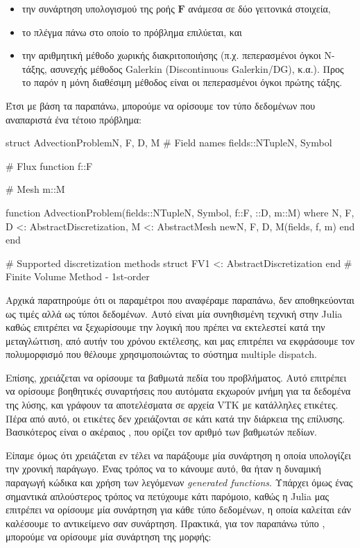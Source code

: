 \begin{itemize}
    \item την συνάρτηση υπολογισμού της ροής $\mathbf{F}$ ανάμεσα σε δύο γειτονικά στοιχεία,
    \item το πλέγμα πάνω στο οποίο το πρόβλημα επιλύεται, και
    \item την αριθμητική μέθοδο χωρικής διακριτοποιήσης (π.χ. πεπερασμένοι όγκοι N-τάξης, ασυνεχής μέθοδος Galerkin (Discontinuous Galerkin/DG), κ.α.). Προς το παρόν η μόνη διαθέσιμη μέθοδος είναι οι πεπερασμένοι όγκοι πρώτης τάξης.
\end{itemize}

Έτσι με βάση τα παραπάνω, μπορούμε να ορίσουμε τον τύπο δεδομένων που αναπαριστά ένα τέτοιο πρόβλημα:

{\large
\begin{jllisting}[language=julia,style=jlcodestyle]
struct AdvectionProblem{N, F, D, M}
    # Field names
    fields::NTuple{N, Symbol}

    # Flux function
    f::F

    # Mesh
    m::M

    function AdvectionProblem(fields::NTuple{N, Symbol}, f::F, ::D, m::M) where
            {N, F, D <: AbstractDiscretization, M <: AbstractMesh}
        new{N, F, D, M}(fields, f, m)
    end
end

# Supported discretization methods
struct FV1 <: AbstractDiscretization end # Finite Volume Method - 1st-order
\end{jllisting}
}

Αρχικά παρατηρούμε ότι οι παραμέτροι που αναφέραμε παραπάνω, δεν αποθηκεύονται ως τιμές αλλά ως τύποι δεδομένων.
Αυτό είναι μία συνηθισμένη τεχνική στην Julia καθώς επιτρέπει να ξεχωρίσουμε την λογική που πρέπει να εκτελεστεί κατά την μεταγλώττιση, από αυτήν του χρόνου εκτέλεσης, και μας επιτρέπει να εκφράσουμε τον πολυμορφισμό που θέλουμε χρησιμοποιώντας το σύστημα multiple dispatch.

Επίσης, χρειάζεται να ορίσουμε τα βαθμωτά πεδία του προβλήματος.
Αυτό επιτρέπει να ορίσουμε βοηθητικές συναρτήσεις που αυτόματα εκχωρούν μνήμη για τα δεδομένα της λύσης, και γράφουν τα αποτελέσματα σε αρχεία VTK με κατάλληλες ετικέτες.
Πέρα από αυτό, οι ετικέτες δεν χρειάζονται σε κάτι κατά την διάρκεια της επίλυσης.
Βασικότερος είναι ο ακέραιος , που ορίζει τον αριθμό των βαθμωτών πεδίων.

Είπαμε όμως ότι χρειάζεται εν τέλει να παράξουμε μία συνάρτηση η οποία υπολογίζει την χρονική παράγωγο.
Ένας τρόπος να το κάνουμε αυτό, θα ήταν η δυναμική παραγωγή κώδικα και χρήση των λεγόμενων \emph{generated functions}.
Υπάρχει όμως ένας σημαντικά απλούστερος τρόπος να πετύχουμε κάτι παρόμοιο, καθώς η Julia μας επιτρέπει να ορίσουμε μία συνάρτηση για κάθε τύπο δεδομένων, η οποία καλείται εάν καλέσουμε το αντικείμενο σαν συνάρτηση.
Πρακτικά, για τον παραπάνω τύπο , μπορούμε να ορίσουμε μία συνάρτηση της μορφής:

